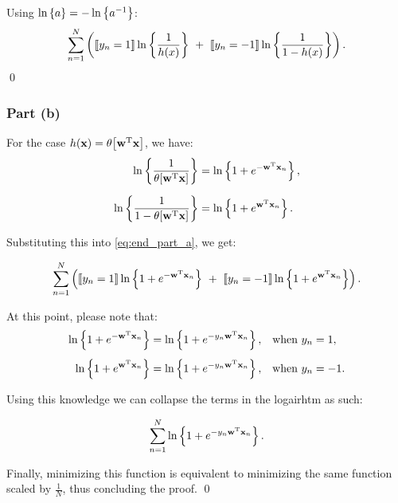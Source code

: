 Using $\ln \left\{a\right\} = -\ln \left\{a^{-1}\right\}$:
\begin{align}
  \sum_{n = 1}^N \left(\llbracket y_n = 1 \rrbracket \ln \left\{\frac{1}{h(x)}\right\}\ +\
  \llbracket y_n =
  -1 \rrbracket\ln \left\{\frac{1}{1 - h(x)}\right\}\right).
  \label{eq:end_part_a}
\end{align}
\qed

\subsubsection{Part (b)}

\noindent For the case $h(\mathbf{x}) = \theta\!\left[\mathbf{w}^{\text{T}}\mathbf{x}\right]$, we have:
\begin{align*}
  \ln \left\{\frac{1}{\theta\!\left[\mathbf{w}^{\text{T}}\mathbf{x}\right]}\right\}    &= \ln \left\{1 + e^{-\mathbf{w}^{\text{T}} \mathbf{x}_n}\right\},\\[6pt]
  \ln \left\{\frac{1}{1 - \theta\!\left[\mathbf{w}^{\text{T}}\mathbf{x}\right]}\right\} &= \ln \left\{1 + e^{\mathbf{w}^{\text{T}} \mathbf{x}_n}\right\}.
\end{align*}

\noindent Substituting this into \cref{eq:end_part_a}, we get:

\begin{align*}
  \sum_{n = 1}^N \left(\llbracket y_n = 1 \rrbracket \ln \left\{1 + e^{-\mathbf{w}^{\text{T}} \mathbf{x}_n}\right\}\ +\ \llbracket y_n =
  -1 \rrbracket\ln \left\{1 + e^{\mathbf{w}^{\text{T}} \mathbf{x}_n}\right\}\right).
\end{align*}

\noindent At this point, please note that:
\begin{align*}
  \ln \left\{1 + e^{-\mathbf{w}^{\text{T}} \mathbf{x}_n}\right\} = \ln \left\{1 + e^{-y_n \mathbf{w}^{\text{T}} \mathbf{x}_n}\right\}, \quad
  &\text{when } y_n = 1,\\[4pt]
  \ln \left\{1 + e^{\mathbf{w}^{\text{T}} \mathbf{x}_n}\right\} = \ln \left\{1 + e^{-y_n \mathbf{w}^{\text{T}} \mathbf{x}_n}\right\}, \quad
  &\text{when } y_n = -1.
\end{align*}

\noindent Using this knowledge we can collapse the terms in the logairhtm as
such:

\begin{align*}
  \sum_{n = 1}^N \ln \left\{1 + e^{-y_n\mathbf{w}^{\text{T}} \mathbf{x}_n}\right\}.
\end{align*}

\noindent Finally, minimizing this function is equivalent to minimizing the same
function scaled by $\tfrac{1}{N}$, thus concluding the proof.
\qed
